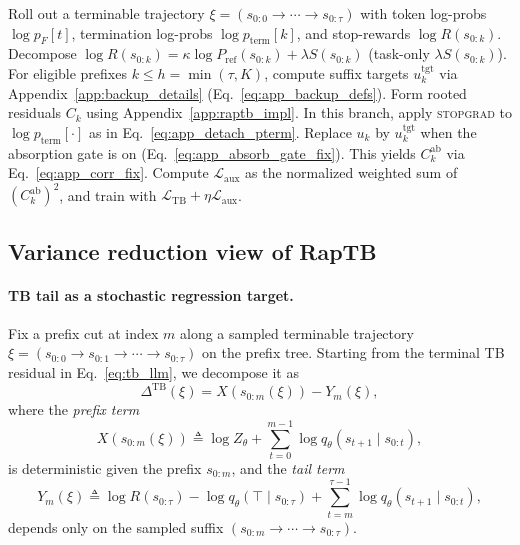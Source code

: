 \documentclass{article}
\theoremstyle{plain}
\theoremstyle{definition}
\theoremstyle{remark}
\begin{document}
\begin{algorithm}[t]
\caption{RapTB auxiliary targets (single trajectory)}
\label{alg:raptb}
\begin{algorithmic}[1]
\STATE Roll out a terminable trajectory \(\xi=(s_{0:0}\to\cdots\to s_{0:\tau})\) with token log-probs \(\log p_F[t]\), termination log-probs \(\log p_{\mathrm{term}}[k]\), and stop-rewards \(\log R(s_{0:k})\).
\STATE Decompose \(\log R(s_{0:k})=\kappa\log P_{\mathrm{ref}}(s_{0:k})+\lambda S(s_{0:k})\) (task-only $\lambda S(s_{0:k})$).
\STATE For eligible prefixes \(k\le h=\min(\tau,K)\), compute suffix targets \(u^{\mathrm{tgt}}_k\)
\STATE \hspace{1.1em}via Appendix~\ref{app:backup_details} (Eq.~\eqref{eq:app_backup_defs}).
\STATE Form rooted residuals \(C_k\) using Appendix~\ref{app:raptb_impl}.
\STATE \hspace{1.1em}In this branch, apply \textsc{stopgrad} to \(\log p_{\mathrm{term}}[\cdot]\) as in Eq.~\eqref{eq:app_detach_pterm}.
\STATE Replace \(u_k\) by \(u^{\mathrm{tgt}}_k\) when the absorption gate is on (Eq.~\eqref{eq:app_absorb_gate_fix}).
\STATE \hspace{1.1em}This yields \(C_k^{\mathrm{ab}}\) via Eq.~\eqref{eq:app_corr_fix}.
\STATE Compute \(\mathcal{L}_{\mathrm{aux}}\) as the normalized weighted sum of \((C_k^{\mathrm{ab}})^2\), and train with \(\mathcal{L}_{\mathrm{TB}}+\eta\mathcal{L}_{\mathrm{aux}}\).
\end{algorithmic}
\end{algorithm}


\subsection{Variance reduction view of RapTB}
\label{app:vr_view}

\paragraph{TB tail as a stochastic regression target.}
Fix a prefix cut at index $m$ along a sampled terminable trajectory
$\xi=(s_{0:0}\to s_{0:1}\to\cdots\to s_{0:\tau})$ on the prefix tree.
Starting from the terminal TB residual in Eq.~\eqref{eq:tb_llm}, we decompose it as
\begin{equation}
\label{eq:app_tb_cut}
\Delta^{\mathrm{TB}}(\xi)=X(s_{0:m}(\xi)) - Y_m(\xi),
\end{equation}
where the \emph{prefix term}
\begin{equation}
\label{eq:app_X_def}
X(s_{0:m}(\xi))
\triangleq
\log Z_\theta
+\sum_{t=0}^{m-1}\log q_\theta(s_{t+1}\mid s_{0:t}),
\end{equation}
 is deterministic given the prefix $s_{0:m}$, and the \emph{tail term}
\begin{equation}
\label{eq:app_Y_def}
Y_m(\xi)
\triangleq
\log R(s_{0:\tau})
-\log q_\theta(\top\mid s_{0:\tau})
+\sum_{t=m}^{\tau-1}\log q_\theta(s_{t+1}\mid s_{0:t}),
\end{equation}
depends only on the sampled suffix $(s_{0:m}\to\cdots\to s_{0:\tau})$.
\end{document}
